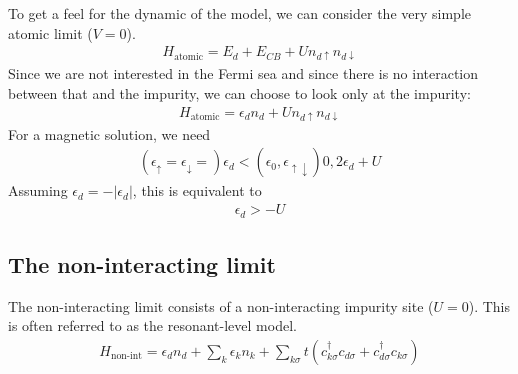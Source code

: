 \documentclass[twoside]{report}
\numberwithin{equation}{section}
\begin{document}
To get a feel for the dynamic of the model, we can consider the very simple atomic limit (\(V = 0\)).
\begin{equation}\begin{aligned}
H_\text{atomic} = E_d + E_{CB} + U n_{d\uparrow}n_{d\downarrow}
\end{aligned}\end{equation}
Since we are not interested in the Fermi sea and since there is no interaction between that and the impurity, we can choose to look only at the impurity:
\begin{equation}\begin{aligned}
H_\text{atomic} = \epsilon_d n_d + U n_{d\uparrow}n_{d\downarrow}
\end{aligned}\end{equation}
For a magnetic solution, we need
\begin{equation}\begin{aligned}
(\epsilon_\uparrow = \epsilon_\downarrow =)\epsilon_d < (\epsilon_0,\epsilon_{\uparrow\downarrow}) 0,2\epsilon_d + U
\end{aligned}\end{equation}
Assuming \(\epsilon_d = -|\epsilon_d|\), this is equivalent to
\begin{equation}\begin{aligned}
\epsilon_d > -U
\end{aligned}\end{equation}

\subsection{The non-interacting limit}
The non-interacting limit consists of a non-interacting impurity site (\(U = 0\)). This is often referred to as the resonant-level model.
\begin{equation}\begin{aligned}
	H_\text{non-int} = \epsilon_d n_d + \sum_k \epsilon_k n_k + \sum_{k\sigma} t\left(c^\dagger_{k\sigma}c_{d\sigma}+c^\dagger_{d\sigma}c_{k\sigma}\right)
\end{aligned}\end{equation}
\end{document}
